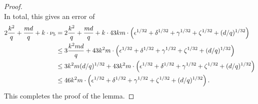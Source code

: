 \begin{proof}
\begin{equation*}
\end{equation*}
In total, this gives an error of
\begin{align*}
2 \frac{k^2}{q}  + \frac{md}{q}+ k \cdot \nu_5
& = 2 \frac{k^2}{q}  + \frac{md}{q} + k \cdot 43 km \cdot \left(\epsilon^{1/32} + \delta^{1/32} + \gamma^{1/32} + \zeta^{1/32} +  (d/q)^{1/32}\right)\\
& \leq 3 \frac{k^2 md}{q}  +  43 k^2m \cdot \left(\epsilon^{1/32} + \delta^{1/32} +\gamma^{1/32} +\zeta^{1/32} +  (d/q)^{1/32}\right)\\
& \leq 3 k^2 m (d/q)^{1/32}  +  43 k^2m \cdot \left(\epsilon^{1/32} + \delta^{1/32} +\gamma^{1/32} +  \zeta^{1/32} + (d/q)^{1/32}\right)\\
& \leq  46 k^2m \cdot \left(\epsilon^{1/32} + \delta^{1/32} + \gamma^{1/32} +  \zeta^{1/32} +(d/q)^{1/32}\right).
\end{align*}
This completes the proof of the lemma.
\end{proof}




